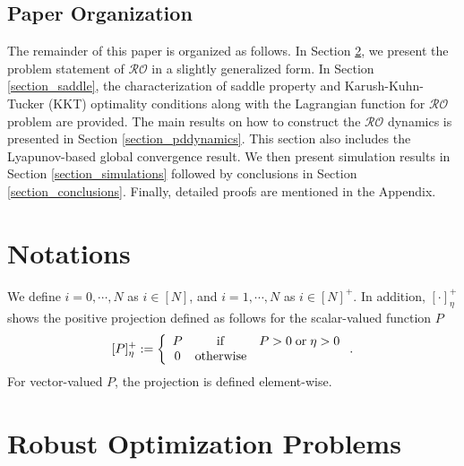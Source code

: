\documentclass[journal,twoside,web]{ieeecolor}
\newcommand{\rev}[1]{\textcolor{revisionblue}{#1}}
\begin{document}
\subsection*{\rev{Paper Organization}}

\rev{The remainder of this paper is organized as follows. In Section \ref{sec_RO}, we present the problem statement of $\mathcal{RO}$ in a slightly generalized form. In Section \ref{section_saddle}, the characterization of saddle property and Karush-Kuhn-Tucker (KKT) optimality conditions along with the Lagrangian function for $\mathcal{RO}$ problem are provided. The main results on how to construct the $\mathcal{RO}$ dynamics is presented in Section \ref{section_pddynamics}. This section also includes the Lyapunov-based global convergence result. We then present simulation results in Section \ref{section_simulations} followed by conclusions in Section \ref{section_conclusions}.}
Finally, detailed proofs are mentioned in the Appendix.

\section{Notations}\label{notations}

We define $i=0,\cdots,N$ as $i\in[N]$, and $i=1,\cdots,N$ as $i\in[N]^+$. In addition, $\left[\cdot\right]_\eta^+$ shows the positive projection defined as follows for the scalar-valued function $P$
\begin{align} \label{proj}
[P]_\eta^+:=\left\{\begin{array}{ccl}P&{\rm if}& P>0 \;{\rm or} \;\eta>0\\
0&{\rm otherwise}
\end{array}\right..
\end{align}
For vector-valued $P$, the projection is defined element-wise.

\section{Robust Optimization Problems}\label{sec_RO}
\end{document}
